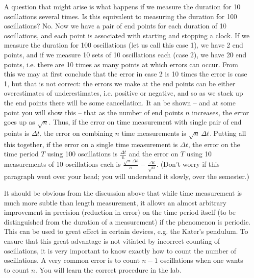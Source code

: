 A question that might arise is what happens if we measure the duration for 10 oscillations several times. Is this equivalent to measuring the duration for 100 oscillations? No. Now we have a pair of end points for each duration of 10 oscillations, and each point is associated with starting and stopping a clock. If we measure the duration for 100 oscillations (let us call this case 1), we have 2 end points, and if we measure 10 sets of 10 oscillations each (case 2), we have 20 end points, i.e. there are 10 times as many points at which errors can occur. From this we may at first conclude that the error in case 2 is 10 times the error is case 1, but that is not correct: the errors we make at the end points can be either overestimates of underestimates, i.e. positive or negative, and so as we stack up the end points there will be some cancellation. It an be shown -- and at some point you will show this -- that as the number of end points $n$ increases, the error goes up as $\sqrt{n}$. Thus, if the error on time measurement with single pair of end points is $\Delta t$, the error on combining $n$ time measurements is $\sqrt{n} \, \Delta t$. Putting all this together, if the error on a single time measurement is $\Delta t$, the error on the time period $T$ using 100 oscillations is $\frac{\Delta t}{n}$ and the error on $T$ using 10 measurements of 10 oscillations each is $\frac{\sqrt{n} \, \Delta t}{n} = \frac{\Delta t}{\sqrt{n}}$. (Don't worry if this paragraph went over your head; you will understand it slowly, over the semester.)

It should be obvious from the discussion above that while time measurement is much more subtle than length measurement, it allows an almost arbitrary improvement in precision (reduction in error) on the time period itself (to be distinguished from the duration of a measurement)  if the phenomenon is periodic. This can be used to great effect in certain devices, e.g. the Kater's pendulum. To ensure that this great advantage is not vitiated by incorrect counting of oscillations, it is very important to know exactly how to count the number of oscillations. A very common error is to count $n-1$ oscillations when one wants to count $n$. You will learn the correct procedure in the lab. 



